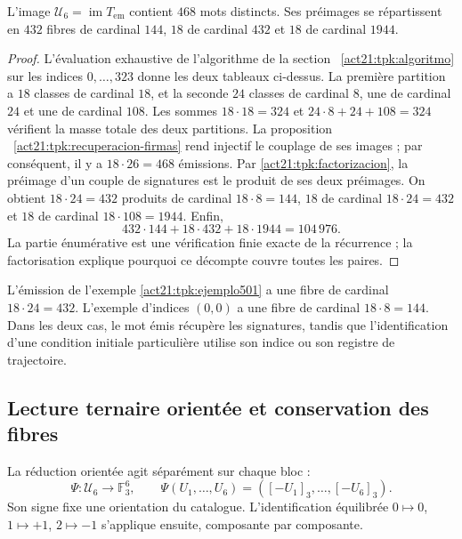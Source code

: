 \begin{proposition}
\label{act21:tpk:468}
L'image \(\mathcal U_6=\operatorname{im}T_{\mathrm{em}}\) contient
\(468\) mots distincts. Ses préimages se répartissent en \(432\)
fibres de cardinal \(144\), \(18\) de cardinal \(432\) et \(18\) de
cardinal \(1944\).
\end{proposition}
\begin{proof}
L'évaluation exhaustive de l'algorithme de la section ~\ref{act21:tpk:algoritmo} sur les indices \(0,\ldots,323\) donne les deux tableaux ci-dessus. La première partition a \(18\) classes de cardinal \(18\), et la seconde \(24\) classes de cardinal \(8\), une de cardinal \(24\) et une de cardinal \(108\). Les sommes \(18\cdot18=324\) et \(24\cdot8+24+108=324\) vérifient la masse totale des deux partitions. La proposition ~\ref{act21:tpk:recuperacion-firmas} rend injectif le couplage de ses images ; par conséquent, il y a \(18\cdot26=468\) émissions. Par \eqref{act21:tpk:factorizacion}, la préimage d'un couple de signatures est le produit de ses deux préimages. On obtient \(18\cdot24=432\) produits de cardinal \(18\cdot8=144\), \(18\) de cardinal \(18\cdot24=432\) et \(18\) de cardinal \(18\cdot108=1944\). Enfin,
\[
 432\cdot144+18\cdot432+18\cdot1944=104\,976.
\]
La partie énumérative est une vérification finie exacte de la récurrence ;
la factorisation explique pourquoi ce décompte couvre toutes les paires.
\end{proof}

L'émission de l'exemple \ref{act21:tpk:ejemplo501} a une fibre de cardinal
\(18\cdot24=432\). L'exemple d'indices \((0,0)\) a une fibre de
cardinal \(18\cdot8=144\). Dans les deux cas, le mot émis récupère
les signatures, tandis que l'identification d'une condition initiale particulière
utilise son indice ou son registre de trajectoire.

\subsection{Lecture ternaire orientée et conservation des fibres}
\label{act21:tpk:reduccion-ternaria}

La réduction orientée agit séparément sur chaque bloc :
\begin{equation}
 \Psi:\mathcal U_6\longrightarrow\mathbb F_3^6,\qquad
 \Psi(U_1,\ldots,U_6)=([-U_1]_3,\ldots,[-U_6]_3).
 \label{act21:tpk:psi}
\end{equation}
Son signe fixe une orientation du catalogue. L'identification équilibrée
\(0\mapsto0\), \(1\mapsto+1\), \(2\mapsto-1\) s'applique ensuite,
composante par composante.

